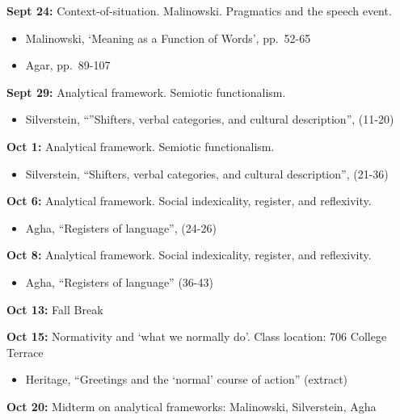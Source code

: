 \documentclass[12pt]{article}
\providecommand{\tightlist}{%
  \setlength{\itemsep}{0pt}\setlength{\parskip}{0pt}}
\begin{document}
\textbf{Sept 24:} Context-of-situation. Malinowski. Pragmatics and the
speech event.

\begin{itemize}
\tightlist
\item
  Malinowski, `Meaning as a Function of Words', pp.~52-65
\item
  Agar, pp.~89-107
\end{itemize}

\textbf{Sept 29:} Analytical framework. Semiotic functionalism.

\begin{itemize}
\tightlist
\item
  Silverstein, ``''Shifters, verbal categories, and cultural
  description'', (11-20)
\end{itemize}

\textbf{Oct 1:} Analytical framework. Semiotic functionalism.

\begin{itemize}
\tightlist
\item
  Silverstein, ``Shifters, verbal categories, and cultural
  description'', (21-36)
\end{itemize}

\textbf{Oct 6:} Analytical framework. Social indexicality, register, and
reflexivity.

\begin{itemize}
\tightlist
\item
  Agha, ``Registers of language'', (24-26)
\end{itemize}

\textbf{Oct 8:} Analytical framework. Social indexicality, register, and
reflexivity.

\begin{itemize}
\tightlist
\item
  Agha, ``Registers of language'' (36-43)
\end{itemize}

\textbf{Oct 13:} Fall Break

\textbf{Oct 15:} Normativity and `what we normally do'. Class location:
706 College Terrace

\begin{itemize}
\tightlist
\item
  Heritage, ``Greetings and the `normal' course of action'' (extract)
\end{itemize}

\textbf{Oct 20:} Midterm on analytical frameworks: Malinowski,
Silverstein, Agha
\end{document}
